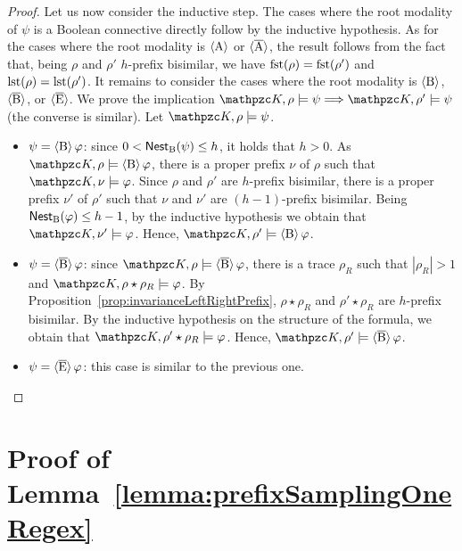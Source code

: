 \begin{proof}
Let us now consider the inductive step.
The cases where the root modality of $\psi$ is a Boolean connective directly follow by the inductive hypothesis.
As for the cases where the root modality is $\operatorname{\langle A\rangle}$ or $\operatorname{\langle \overline{A}\rangle}$, the result follows from the fact that, being $\rho$ and $\rho'$ $h$-prefix bisimilar, we have
$\operatorname{fst}(\rho)=\operatorname{fst}(\rho')$ and $\operatorname{lst}(\rho)=\operatorname{lst}(\rho')$.
It remains to consider the cases where the root modality is  $\operatorname{\langle B\rangle}$, $\operatorname{\langle \overline{B}\rangle}$, or $\operatorname{\langle \overline{E}\rangle}$. We prove the implication
$\Ku,\rho\models \psi \Longrightarrow \Ku,\rho'\models \psi$ (the converse is similar).  Let
$\Ku,\rho\models \psi$. %
\begin{itemize}
  \item $\psi=\operatorname{\langle B\rangle}\varphi$: since $0<\operatorname{\mathsf{Nest}_B}(\psi)\leq h$,  it holds that $h>0$.  As $\Ku,\rho\models\hsB\varphi$,   there is a proper prefix $\nu$ of $\rho$  such that $\Ku,\nu\models\varphi$.
  Since $\rho$ and $\rho'$ are $h$-prefix bisimilar, there is a proper prefix $\nu'$ of $\rho'$ such that $\nu$ and $\nu'$ are $(h-1)$-prefix bisimilar.
  Being $\operatorname{\mathsf{Nest}_B}(\varphi)\leq h-1$, by the inductive hypothesis we obtain that  $\Ku,\nu'\models\varphi$. Hence,  $\Ku,\rho'\models\hsB\varphi$.
  \item $\psi=\operatorname{\langle \overline{B}\rangle}\varphi$: since $\Ku,\rho\models\hsBt\varphi$, there is a trace $\rho_R$ such that $|\rho_R|>1$ and
$\Ku,\rho\star\rho_R\models\varphi$. By Proposition~\ref{prop:invarianceLeftRightPrefix}, $\rho\star\rho_R$ and $\rho'\star\rho_R$ are $h$-prefix bisimilar. By the inductive hypothesis on  the structure of the formula, we obtain that $\Ku,\rho'\star\rho_R\models\varphi$. Hence,
  $\Ku,\rho'\models\hsBt\varphi$. %
  \item    $\psi=\operatorname{\langle \overline{E}\rangle}\varphi$: this case is similar to the previous one.\qedhere %
\end{itemize}
\end{proof}


\section{Proof of Lemma~\ref{lemma:prefixSamplingOneRegex}}\label{proof:lemma:prefixSamplingOneRegex}

